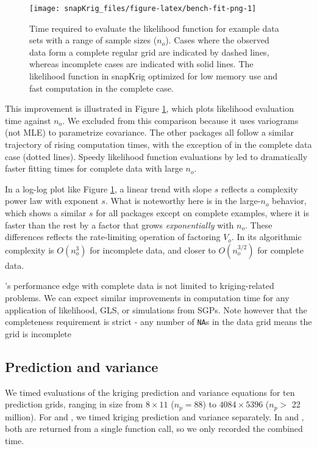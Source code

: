\begin{figure}[!htb]
\texttt{[image: snapKrig\_files/figure-latex/bench-fit-png-1]} \caption{Time required to evaluate the likelihood function for example data sets with a range of sample sizes ($n_o$). Cases where the observed data form a complete regular grid are indicated by dashed lines, whereas incomplete cases are indicated with solid lines. The likelihood function in snapKrig optimized for low memory use and fast computation in the complete case.}\label{fig:bench-fit-png}
\end{figure}

This improvement is illustrated in Figure \ref{fig:bench-fit-png}, which plots likelihood evaluation time against \(n_o\). We excluded  from this comparison because it uses variograms (not MLE) to parametrize covariance. The other packages all follow a similar trajectory of rising computation times, with the exception of  in the complete data case (dotted lines). Speedy likelihood function evaluations by  led to dramatically faster fitting times for complete data with large \(n_o\).

In a log-log plot like Figure \ref{fig:bench-fit-png}, a linear trend with slope \(s\) reflects a complexity power law with exponent \(s\). What is noteworthy here is in the large-\(n_o\) behavior, which shows a similar \(s\) for all packages except  on complete examples, where it is faster than the rest by a factor that grows \emph{exponentially} with \(n_o\). These differences reflects the rate-limiting operation of factoring \(V_o\). In  its algorithmic complexity is \(O( n_o^3 )\) for incomplete data, and closer to \(O(n_o^{3/2})\) for complete data.

's performance edge with complete data is not limited to kriging-related problems. We can expect similar improvements in computation time for any application of likelihood, GLS, or simulations from SGPs. Note however that the completeness requirement is strict - any number of \texttt{NA}s in the data grid means the grid is incomplete

\hypertarget{prediction-and-variance}{%
\subsection{Prediction and variance}\label{prediction-and-variance}}

We timed evaluations of the kriging prediction and variance equations for ten prediction grids, ranging in size from \(8 \times 11\) (\(n_p=88\)) to \(4084 \times 5396\) (\(n_p>\) 22 million). For  and , we timed kriging prediction and variance separately. In  and , both are returned from a single function call, so we only recorded the combined time.

